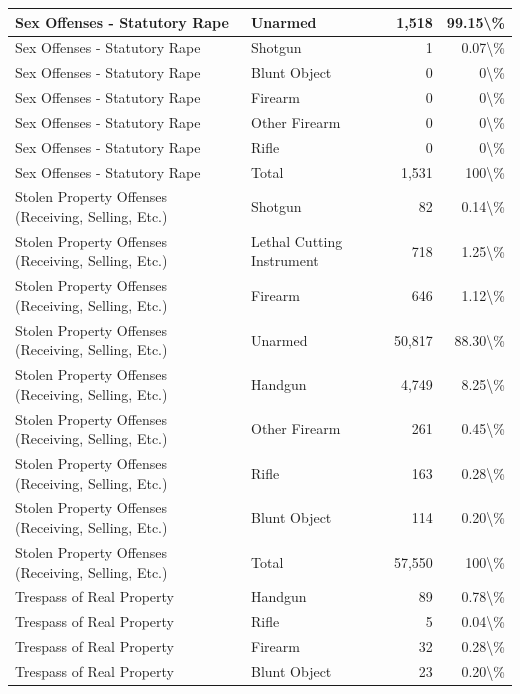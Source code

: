 \documentclass[
]{krantz}
\begin{document}
\begin{longtable}[t]{l|l|r|r}
\hline
Sex Offenses - Statutory Rape & Unarmed & 1,518 & 99.15\textbackslash{}\%\\
\hline
Sex Offenses - Statutory Rape & Shotgun & 1 & 0.07\textbackslash{}\%\\
\hline
Sex Offenses - Statutory Rape & Blunt Object & 0 & 0\textbackslash{}\%\\
\hline
Sex Offenses - Statutory Rape & Firearm & 0 & 0\textbackslash{}\%\\
\hline
Sex Offenses - Statutory Rape & Other Firearm & 0 & 0\textbackslash{}\%\\
\hline
Sex Offenses - Statutory Rape & Rifle & 0 & 0\textbackslash{}\%\\
\hline
Sex Offenses - Statutory Rape & Total & 1,531 & 100\textbackslash{}\%\\
\hline
Stolen Property Offenses (Receiving, Selling, Etc.) & Shotgun & 82 & 0.14\textbackslash{}\%\\
\hline
Stolen Property Offenses (Receiving, Selling, Etc.) & Lethal Cutting Instrument & 718 & 1.25\textbackslash{}\%\\
\hline
Stolen Property Offenses (Receiving, Selling, Etc.) & Firearm & 646 & 1.12\textbackslash{}\%\\
\hline
Stolen Property Offenses (Receiving, Selling, Etc.) & Unarmed & 50,817 & 88.30\textbackslash{}\%\\
\hline
Stolen Property Offenses (Receiving, Selling, Etc.) & Handgun & 4,749 & 8.25\textbackslash{}\%\\
\hline
Stolen Property Offenses (Receiving, Selling, Etc.) & Other Firearm & 261 & 0.45\textbackslash{}\%\\
\hline
Stolen Property Offenses (Receiving, Selling, Etc.) & Rifle & 163 & 0.28\textbackslash{}\%\\
\hline
Stolen Property Offenses (Receiving, Selling, Etc.) & Blunt Object & 114 & 0.20\textbackslash{}\%\\
\hline
Stolen Property Offenses (Receiving, Selling, Etc.) & Total & 57,550 & 100\textbackslash{}\%\\
\hline
Trespass of Real Property & Handgun & 89 & 0.78\textbackslash{}\%\\
\hline
Trespass of Real Property & Rifle & 5 & 0.04\textbackslash{}\%\\
\hline
Trespass of Real Property & Firearm & 32 & 0.28\textbackslash{}\%\\
\hline
Trespass of Real Property & Blunt Object & 23 & 0.20\textbackslash{}\%\\

\end{longtable}
\end{document}
